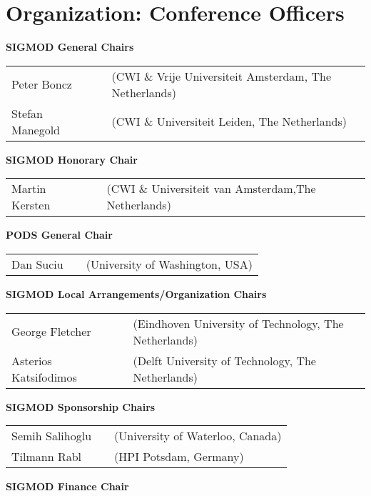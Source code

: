 \clearpage
\ifodd\value{page}\hbox{}\newpage\fi
\section*{Organization: Conference Officers}

{
\setlength{\tabcolsep}{0pt}
\small

\textbf{SIGMOD General Chairs}

\begin{tabular}{lp{.5em}l}
Peter Boncz	&& \textsf{\footnotesize(CWI \& Vrije Universiteit Amsterdam, The Netherlands)}	\\
Stefan Manegold	&& \textsf{\footnotesize(CWI \& Universiteit Leiden, The Netherlands)}	\\
\end{tabular}

\vfill
\textbf{SIGMOD Honorary Chair}

\begin{tabular}{lp{.5em}l}
Martin Kersten	&& \textsf{\footnotesize(CWI \& Universiteit van Amsterdam,The Netherlands)}
\end{tabular}

\vfill
\textbf{PODS General Chair}

\begin{tabular}{lp{.5em}l}
Dan Suciu	&& \textsf{\footnotesize(University of Washington, USA)}
\end{tabular}

\vfill
\textbf{SIGMOD Local Arrangements/Organization Chairs}

\begin{tabular}{lp{.5em}l}
George Fletcher	&& \textsf{\footnotesize(Eindhoven University of Technology, The Netherlands)}	\\
Asterios Katsifodimos	&& \textsf{\footnotesize(Delft University of Technology, The Netherlands)}
\end{tabular}

\vfill
\textbf{SIGMOD Sponsorship Chairs}

\begin{tabular}{lp{.5em}l}
Semih Salihoglu	&& \textsf{\footnotesize(University of Waterloo, Canada)}	\\
Tilmann Rabl	&& \textsf{\footnotesize(HPI Potsdam, Germany)}
\end{tabular}

\vfill
\textbf{SIGMOD Finance Chair}

}
